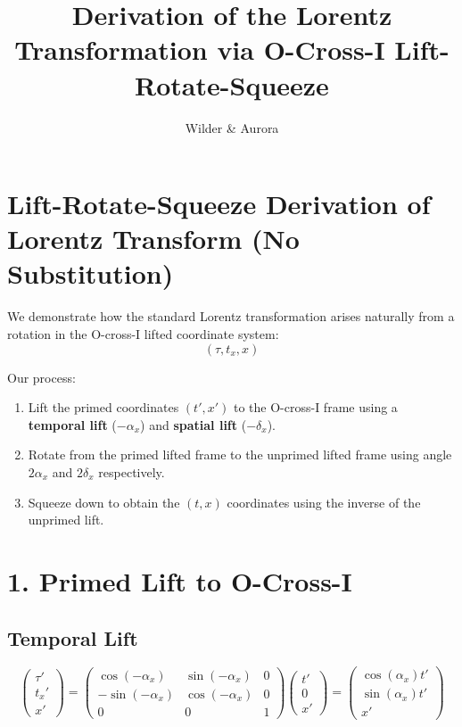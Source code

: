 \documentclass[12pt]{article}
\title{Derivation of the Lorentz Transformation via O-Cross-I Lift-Rotate-Squeeze}
\author{Wilder \& Aurora}
\date{}
\begin{document}
\maketitle

\section*{Lift-Rotate-Squeeze Derivation of Lorentz Transform (No Substitution)}

We demonstrate how the standard Lorentz transformation arises naturally from a rotation in the O-cross-I lifted coordinate system:
\[
(\tau, t_x, x)
\]

Our process:
\begin{enumerate}
  \item Lift the primed coordinates $(t', x')$ to the O-cross-I frame using a \textbf{temporal lift} ($-\alpha_x$) and \textbf{spatial lift} ($-\delta_x$).
  \item Rotate from the primed lifted frame to the unprimed lifted frame using angle $2\alpha_x$ and $2\delta_x$ respectively.
  \item Squeeze down to obtain the $(t, x)$ coordinates using the inverse of the unprimed lift.
\end{enumerate}

\vspace{10pt}

\section*{1. Primed Lift to O-Cross-I}

\subsection*{Temporal Lift}
\[
\begin{pmatrix}
\tau' \\
t_x' \\
x'
\end{pmatrix}
=
\begin{pmatrix}
\cos(-\alpha_x) & \sin(-\alpha_x) & 0 \\
-\sin(-\alpha_x) & \cos(-\alpha_x) & 0 \\
0 & 0 & 1
\end{pmatrix}
\begin{pmatrix}
t' \\
0 \\
x'
\end{pmatrix}
=
\begin{pmatrix}
\cos(\alpha_x) t' \\
\sin(\alpha_x) t' \\
x'
\end{pmatrix}
\]
\end{document}

